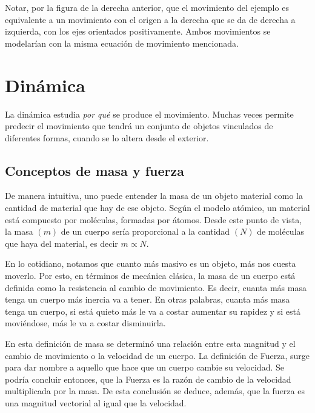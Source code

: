 \documentclass[a5paper,12pt,twoside]{book}
\begin{document}
\begin{mdframed}[style=MyFrame2]
    \begin{center}
        \vspace{-6cm}
        \def\svgwidth{\linewidth}
        
        \vspace{-6cm}
    \end{center}
    
    Notar, por la figura de la derecha anterior, que el movimiento del ejemplo es equivalente a un movimiento con el origen a la derecha que se da de derecha a izquierda, con los ejes orientados positivamente. Ambos movimientos se modelarían con la misma ecuación de movimiento mencionada.
\end{mdframed}


\chapter{Dinámica}
\label{cha:dinamics}


La dinámica estudia \emph{por qué} se produce el movimiento.
Muchas veces permite predecir el movimiento que tendrá un conjunto de objetos vinculados de diferentes formas, cuando se lo altera desde el exterior.


\section{Conceptos de masa y fuerza}

De manera intuitiva, uno puede entender la masa de un objeto material como la cantidad de material que hay de ese objeto. Según el modelo atómico, un material está compuesto por moléculas, formadas por átomos. Desde este punto de vista, la masa $(m)$ de un cuerpo sería proporcional a la cantidad $(N)$ de moléculas que haya del material, es decir $ m \propto N $.

En lo cotidiano, notamos que cuanto más masivo es un objeto, más nos cuesta moverlo. Por esto, en términos de mecánica clásica, la masa de un cuerpo está definida como la resistencia al cambio de movimiento. Es decir, cuanta más masa tenga un cuerpo más inercia va a tener. En otras palabras, cuanta más masa tenga un cuerpo, si está quieto más le va a costar aumentar su rapidez y si está moviéndose, más le va a costar disminuirla.

En esta definición de masa se determinó una relación entre esta magnitud y el cambio de movimiento o la velocidad de un cuerpo. La definición de Fuerza, surge para dar nombre a aquello que hace que un cuerpo cambie su velocidad. Se podría concluir entonces, que la Fuerza es la razón de cambio de la velocidad multiplicada por la masa. De esta conclusión se deduce, además, que la fuerza es una magnitud vectorial al igual que la velocidad.
\end{document}
